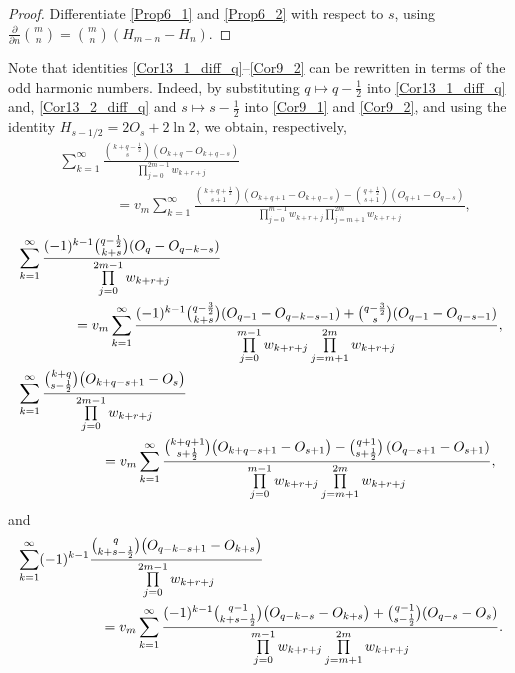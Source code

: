 \documentclass[12pt,reqno]{article}
\begin{document}
\begin{proof} Differentiate  \eqref{Prop6_1} and \eqref{Prop6_2} with respect to $s$, using  
	$\frac{\partial}{\partial n}\binom{m}{n}=\binom{m}{n}(H_{m-n}-H_{n})$.
\end{proof}

Note that identities \eqref{Cor13_1_diff_q}--\eqref{Cor9_2}  can be rewritten in terms of the odd harmonic numbers. Indeed, by substituting $q\mapsto q-\frac{1}{2}$
into   \eqref{Cor13_1_diff_q} and,  \eqref{Cor13_2_diff_q} and $s\mapsto s-\frac{1}{2}$
into   \eqref{Cor9_1} and \eqref{Cor9_2}, and using the identity $H_{s-1/2}=2 O_s+2\ln 2$, we obtain, respectively,
	\begin{align*}
	&\sum_{k = 1}^\infty  \frac{\binom{k+q-\frac12}{s}(O_{k+q}-O_{k+q-s})}{\prod\limits_{j = 0}^{2m - 1} w_{k + r + j}}\\
	&\qquad\qquad = v_m \sum_{k = 1}^\infty 
	\frac{\binom{k+q+\frac12}{s+1}(O_{k+q+1}-O_{k+q-s})- \binom{q+\frac12}{s+1}(O_{q+1}-O_{q-s})}{\prod\limits_{j = 0}^{m - 1} {w_{k + r + j} }\prod\limits_{j = m + 1}^{2m} {w_{k + r + j} } },
	\end{align*}
	\begin{align*}	
	&\sum_{k = 1}^\infty
	\frac{(-1)^{k-1}
		\binom{q-\frac12}{k+s}
		(O_q-O_{q-k-s})}
	{\prod\limits_{j = 0}^{2m - 1} w_{k+r+j}}
	\\
	&\qquad\qquad=v_m
	\sum_{k = 1}^\infty
	\frac{(-1)^{k-1}
		\binom{q-\frac32}{k+s}
		(O_{q-1}-O_{q-k-s-1})+
		\binom{q-\frac32}{s}
		(O_{q-1}-O_{q-s-1})}
	{\prod\limits_{j = 0}^{m - 1} w_{k+r+j}
		\prod\limits_{j = m + 1}^{2m} w_{k+r+j}
	},\\
	&\sum_{k=1}^{\infty} \frac{\binom{k+q}{s-\frac12} \big( O_{k+q-s+1} - O_{s} \big)}{\prod\limits_{j=0}^{2m-1} w_{k+r+j}}\notag\\
	&\qquad\qquad\qquad= v_m \sum_{k=1}^{\infty} \frac{ \binom{k+q+1}{s+\frac12} \big( O_{k+q-s+1} - O_{s+1} \big) - \binom{q+1}{s+\frac12} \left( O_{q-s+1} - O_{s+1} \right) }{\prod\limits_{j=0}^{m-1} w_{k+r+j} \prod\limits_{j=m+1}^{2m} w_{k+r+j}}, 
	\end{align*}
and 
\begin{align*}
	&\sum_{k=1}^{\infty} (-1)^{k-1}\frac{ \binom{q}{k+s-\frac12} \big( O_{q-k-s+1} - O_{k+s} \big)}{\prod\limits_{j=0}^{2m-1} w_{k+r+j}}\notag \\
	&\qquad\qquad\qquad= v_m \sum_{k=1}^{\infty} \frac{ (-1)^{k-1}\binom{q-1}{k+s-\frac12} \big( O_{q-k-s} - O_{k+s}\big) + \binom{q-1}{s-\frac12} ( O_{q-s}  - O_{s})}{\prod\limits_{j=0}^{m-1} w_{k+r+j} \prod\limits_{j=m+1}^{2m} w_{k+r+j}} .
	\end{align*}
\end{document}

